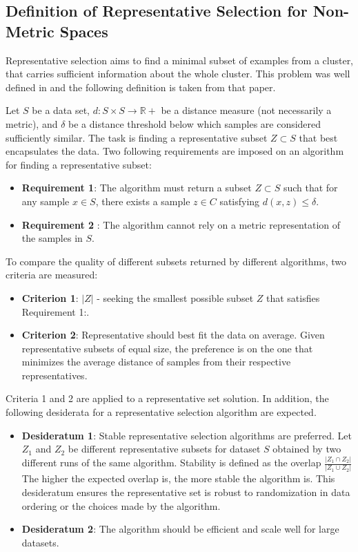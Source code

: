 \documentclass[thesis=B,english]{FITthesis}[2012/10/20]
\begin{document}
\subsection{Definition of Representative Selection for Non-Metric Spaces}\label{sec:def_rep_selection}
Representative selection aims to find a minimal subset of examples from a cluster, that carries sufficient information about the whole cluster.
This problem was well defined in \cite{liebman2015representative} and the following definition is taken from that paper.

Let $S$ be a data set, $d : S \times S \to \mathbb{R} +$ be a distance measure (not necessarily a metric), and $\delta$ be a distance threshold below which samples are considered sufficiently similar.
The task is finding a representative subset $Z \subset S$ that best encapsulates the data.
Two following requirements are imposed on an algorithm for finding a representative subset:
\begin{itemize}
    \item \textbf{Requirement 1}: The algorithm must return a subset $Z \subset S$ such that for any sample $x \in S$, there exists a sample $z \in C$ satisfying $d(x, z) \le \delta$.
    \item \textbf{Requirement 2} : The algorithm cannot rely on a metric representation of the samples in $S$.
\end{itemize}
To compare the quality of different subsets returned by different algorithms, two criteria are measured:
\begin{itemize}
    \item \textbf{Criterion 1}: $|Z|$ - seeking the smallest possible subset $Z$ that satisfies Requirement 1:.
    \item \textbf{Criterion 2}: Representative should best fit the data on average. Given representative subsets of equal size, the preference is on the one that minimizes the average distance of samples from their respective representatives.
\end{itemize}
Criteria 1 and 2 are applied to a representative set solution.
In addition, the following desiderata for a representative selection algorithm are expected.
\begin{itemize}
    \item \textbf{Desideratum 1}: Stable representative selection algorithms are preferred. Let $Z_1$ and $Z_2$ be different representative subsets for dataset $S$ obtained by two different runs of the same algorithm.
Stability is defined as the overlap $\frac{|Z_1 \cap Z_2|}{|Z_1 \cup Z_2|}$      The higher the expected overlap is, the more stable the algorithm is.
This desideratum ensures the representative set is robust to randomization in data ordering or the choices made by the algorithm.
    \item \textbf{Desideratum 2}: The algorithm should be efficient and scale
well for large datasets.
\end{itemize}
\end{document}
